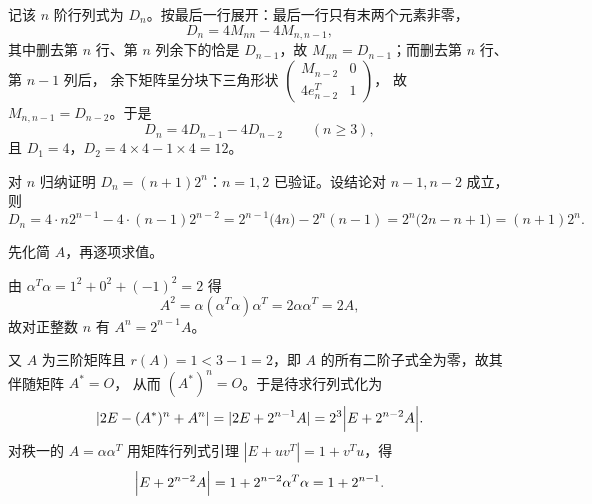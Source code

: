 
\begin{solution}
记该 $n$ 阶行列式为 $D_n$。按最后一行展开：最后一行只有末两个元素非零，
\[
D_n=4M_{nn}-4M_{n,n-1},
\]
其中删去第 $n$ 行、第 $n$ 列余下的恰是 $D_{n-1}$，故 $M_{nn}=D_{n-1}$；而删去第 $n$ 行、第 $n-1$ 列后，
余下矩阵呈分块下三角形状
$\begin{pmatrix}M_{n-2}&0\\ 4e_{n-2}^{T}&1\end{pmatrix}$，
故 $M_{n,n-1}=D_{n-2}$。于是
\[
D_n=4D_{n-1}-4D_{n-2}\qquad(n\ge 3),
\]
且 $D_1=4$，$D_2=4\times4-1\times4=12$。

对 $n$ 归纳证明 $D_n=(n+1)2^{n}$：$n=1,2$ 已验证。设结论对 $n-1,n-2$ 成立，则
\[
D_n=4\cdot n2^{n-1}-4\cdot(n-1)2^{n-2}
=2^{n-1}\bigl(4n\bigr)-2^{n}(n-1)
=2^{n}\bigl(2n-n+1\bigr)=(n+1)2^{n}.
\]
\end{solution}

\begin{solution}
先化简 $A$，再逐项求值。

由 $\alpha^{T}\alpha=1^{2}+0^{2}+(-1)^{2}=2$ 得
\[
A^{2}=\alpha(\alpha^{T}\alpha)\alpha^{T}=2\alpha\alpha^{T}=2A,
\]
故对正整数 $n$ 有 $A^{n}=2^{n-1}A$。

又 $A$ 为三阶矩阵且 $r(A)=1<3-1=2$，即 $A$ 的所有二阶子式全为零，故其伴随矩阵 $A^{*}=O$，
从而 $(A^{*})^{n}=O$。于是待求行列式化为
\[
|2E-(A^{*})^{n}+A^{n}|=|2E+2^{n-1}A|=2^{3}\Bigl|E+2^{n-2}A\Bigr|.
\]
对秩一的 $A=\alpha\alpha^{T}$ 用矩阵行列式引理 $|E+uv^{T}|=1+v^{T}u$，得
\[
\Bigl|E+2^{n-2}A\Bigr|=1+2^{n-2}\alpha^{T}\alpha=1+2^{n-1}.
\]
\end{solution}

